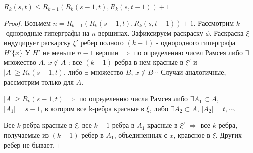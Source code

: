 \begin{theorem}
    $R_k(s, t) \le R_{k - 1}(R_k(s - 1, t), R_k(s, t - 1)) + 1$
    \begin{proof}
        Возьмем $n = R_{k - 1}(R_k(s - 1, t), R_k(s, t - 1)) + 1$. Рассмотрим $k$-однородные гиперграфы на $n$ вершинах. Зафиксируем раскраску $\phi$.
        Раскраска $\xi$ индуцирует раскарску $\xi'$ ребер полного $(k - 1)$ - однородного гиперграфа $H'\{x\}$
        У $H'$ не меньше $n - 1$ вершин $\Rightarrow$ по определению чисел Рамсея либо 
        $\exists$ множество $A$, $x \notin A$ : все $(k - 1)$-ребра в нем красные в $\xi'$ и 
        $|A| \ge R_k(s - 1, t)$, либо $\exists$ множество $B$, $x \notin B \cdots$
        Случаи аналогичные, рассмотрим только для $A$.

        $|A| \ge R_k(s - 1, t)$ $\Rightarrow$ по определению числа Рамсея либо $\exists A_1 \subset A$, $|A_1| = s - 1$, 
        в котором все k-ребра красные в $\xi$, либо $\exists A_2 \subset A$, $|A_2| = t, \cdots.$

        Все $k$-ребра красные в $\xi$, все $k-1$-ребра в $A_1$ красные в $\xi'$ $\Rightarrow$
        все $k$-ребра, получаемые из $(k-1)$-ребер в $A_1$, объединенных с $x$, кравсное в $\xi$.
        Других ребер не бывает.
    \end{proof}
\end{theorem}

